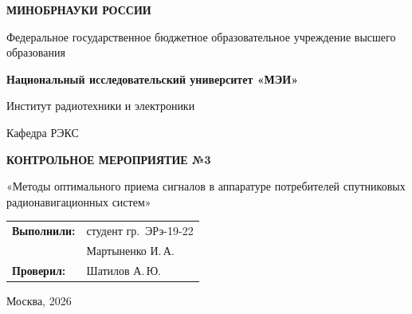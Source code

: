 \begin{titlepage}
    \centering
    {\bfseries МИНОБРНАУКИ РОССИИ\par}
    Федеральное государственное бюджетное образовательное учреждение высшего образования \\
    {\bfseries Национальный исследовательский университет «МЭИ»\par}
    \vspace{1cm}
    Институт радиотехники и электроники\par
    Кафедра РЭКС\par
    \vspace{3cm}
    
    {\bfseries\large КОНТРОЛЬНОЕ МЕРОПРИЯТИЕ №3\par}
    \vspace{0.5cm}
    {\large «Методы оптимального приема сигналов в аппаратуре потребителей спутниковых радионавигационных систем»\par}
    
    \vspace{3.5cm}
 \vspace{1.5cm}
\noindent\hfill
\begin{tabular}{@{}ll@{}}
    \textbf{Выполнили:} & студент гр.~ЭРэ-19-22 \\
                        & Мартыненко И.\,А. \\
    \textbf{Проверил:}  & Шатилов А.\,Ю.
\end{tabular}   
    \vfill
    {Москва, 2026}
\end{titlepage}
